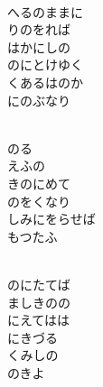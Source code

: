 \documentclass[10pt,b5j]{tarticle} %
\begin{document}
\vspace{1.5em} %
\newcommand{\linespace}{0.5em} %
\newcommand{\blocksize}{0.5\hsize} %
\newcommand{\itemmargin}{6em} %
\begin{enumerate} %
    \setlength{\itemindent}{\itemmargin} %
    \begin{minipage}[c]{\blocksize}
    
        \vspace{\linespace}
        \item~\\
        へるのままに\\
        りのをれば\\
        はかにしの\\
        のにとけゆく\\
        くあるはのか\\
        にのぶなり
        
        \vspace{\linespace}
        \item~\\
        のる\\
        えふの\\
        きのにめて\\
        のをくなり\\
        しみにをらせば\\
        もつたふ
        
        \vspace{\linespace}
        \item~\\
        のにたてば\\
        ましきのの\\
        にえてはは\\
        にきづる\\
        くみしの\\
        のきよ
        

\end{minipage}
\end{enumerate}
\end{document}
